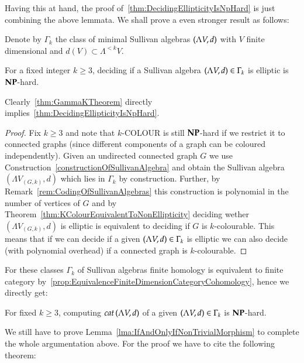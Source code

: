  Having this at hand, the proof of~\ref{thm:DecidingEllipticityIsNpHard} is just combining the above lemmata. We 
 shall prove a even stronger result as follows:
 
 Denote by $\Gamma_k$ the class of minimal Sullivan algebras $(\Lambda V,d)$ with $V$ finite dimensional and
 $d(V) \subset \Lambda^{< k} V$.
 
 \begin{Theorem}
\label{thm:GammaKTheorem}
  For a fixed integer $k \geq 3$, deciding if a Sullivan algebra $(\Lambda V,d) \in \Gamma_k$ is elliptic is $\mathbf{NP}$-hard. 
 \end{Theorem}

 \begin{Remark}
  
 Clearly~\ref{thm:GammaKTheorem} directly implies~\ref{thm:DecidingEllipticityIsNpHard}.
  
 \end{Remark}
 \begin{proof}
  Fix $k \geq 3$ and note that $k$-COLOUR is still $\mathbf{NP}$-hard if we restrict it to connected graphs (since different
  components of a graph can be coloured independently). Given an undirected connected graph $G$ we use
  Construction~\ref{constructionOfSullivanAlgebra} and obtain the Sullivan algebra $(\Lambda V_{(G,k)},d)$ which lies
  in $\Gamma_k$ by construction. Further, by Remark~\ref{rem:CodingOfSullivanAlgebras} this construction is polynomial
  in the number of vertices of $G$ and by Theorem~\ref{thm:KColourEquivalentToNonEllipticity} deciding wether
  $(\Lambda V_{(G,k)},d)$ is elliptic is equivalent to deciding if $G$ is $k$-colourable. This means that if we can 
  decide if a given $(\Lambda V,d) \in \Gamma_k$ is elliptic we can also decide (with polynomial overhead) if a connected
  graph is $k$-colourable.
  \end{proof}

  For these classes $\Gamma_k$ of Sullivan algebras finite homology is equivalent to finite 
  category by~\ref{prop:EquivalenceFiniteDimensionCategoryCohomology}, hence we directly get:
  
  \begin{Corollary}
   For fixed $k \geq 3$, computing $cat \, (\Lambda V,d)$ of a given $(\Lambda V,d) \in \Gamma_k$ is $\mathbf{NP}$-hard.
  \end{Corollary}

  
  We still have to prove Lemma~\ref{lma:IfAndOnlyIfNonTrivialMorphism} to complete the whole argumentation above. For the proof
  we have to cite the following theorem:
  
